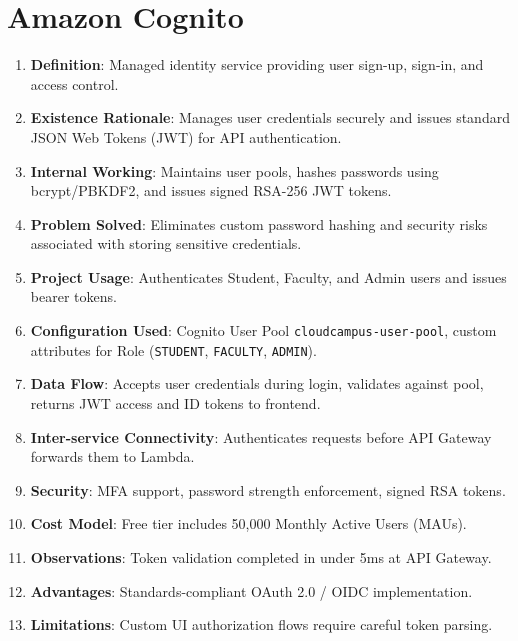 \section{Amazon Cognito}
\begin{enumerate}
    \item \textbf{Definition}: Managed identity service providing user sign-up, sign-in, and access control.
    \item \textbf{Existence Rationale}: Manages user credentials securely and issues standard JSON Web Tokens (JWT) for API authentication.
    \item \textbf{Internal Working}: Maintains user pools, hashes passwords using bcrypt/PBKDF2, and issues signed RSA-256 JWT tokens.
    \item \textbf{Problem Solved}: Eliminates custom password hashing and security risks associated with storing sensitive credentials.
    \item \textbf{Project Usage}: Authenticates Student, Faculty, and Admin users and issues bearer tokens.
    \item \textbf{Configuration Used}: Cognito User Pool \texttt{cloudcampus-user-pool}, custom attributes for Role (\texttt{STUDENT}, \texttt{FACULTY}, \texttt{ADMIN}).
    \item \textbf{Data Flow}: Accepts user credentials during login, validates against pool, returns JWT access and ID tokens to frontend.
    \item \textbf{Inter-service Connectivity}: Authenticates requests before API Gateway forwards them to Lambda.
    \item \textbf{Security}: MFA support, password strength enforcement, signed RSA tokens.
    \item \textbf{Cost Model}: Free tier includes 50,000 Monthly Active Users (MAUs).
    \item \textbf{Observations}: Token validation completed in under 5ms at API Gateway.
    \item \textbf{Advantages}: Standards-compliant OAuth 2.0 / OIDC implementation.
    \item \textbf{Limitations}: Custom UI authorization flows require careful token parsing.
\end{enumerate}

